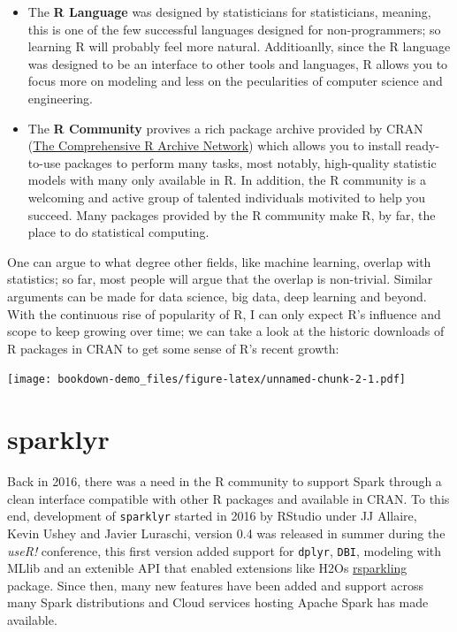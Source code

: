 \documentclass[]{book}
\providecommand{\tightlist}{%
  \setlength{\itemsep}{0pt}\setlength{\parskip}{0pt}}
\theoremstyle{definition}
\theoremstyle{definition}
\theoremstyle{definition}
\theoremstyle{remark}
\begin{document}
\begin{itemize}
\tightlist
\item
  The \textbf{R Language} was designed by statisticians for
  statisticians, meaning, this is one of the few successful languages
  designed for non-programmers; so learning R will probably feel more
  natural. Additioanlly, since the R language was designed to be an
  interface to other tools and languages, R allows you to focus more on
  modeling and less on the pecularities of computer science and
  engineering.
\item
  The \textbf{R Community} provives a rich package archive provided by
  CRAN (\href{https://cran.r-project.org/}{The Comprehensive R Archive
  Network}) which allows you to install ready-to-use packages to perform
  many tasks, most notably, high-quality statistic models with many only
  available in R. In addition, the R community is a welcoming and active
  group of talented individuals motivited to help you succeed. Many
  packages provided by the R community make R, by far, the place to do
  statistical computing.
\end{itemize}

One can argue to what degree other fields, like machine learning,
overlap with statistics; so far, most people will argue that the overlap
is non-trivial. Similar arguments can be made for data science, big
data, deep learning and beyond. With the continuous rise of popularity
of R, I can only expect R's influence and scope to keep growing over
time; we can take a look at the historic downloads of R packages in CRAN
to get some sense of R's recent growth:

\texttt{[image: bookdown-demo\_files/figure-latex/unnamed-chunk-2-1.pdf]}

\section{sparklyr}\label{sparklyr}

Back in 2016, there was a need in the R community to support Spark
through a clean interface compatible with other R packages and available
in CRAN. To this end, development of \texttt{sparklyr} started in 2016
by RStudio under JJ Allaire, Kevin Ushey and Javier Luraschi, version
0.4 was released in summer during the \emph{useR!} conference, this
first version added support for \texttt{dplyr}, \texttt{DBI}, modeling
with MLlib and an extenible API that enabled extensions like H2Os
\href{https://github.com/h2o/rsparkling}{rsparkling} package. Since
then, many new features have been added and support across many Spark
distributions and Cloud services hosting Apache Spark has made
available.
\end{document}
